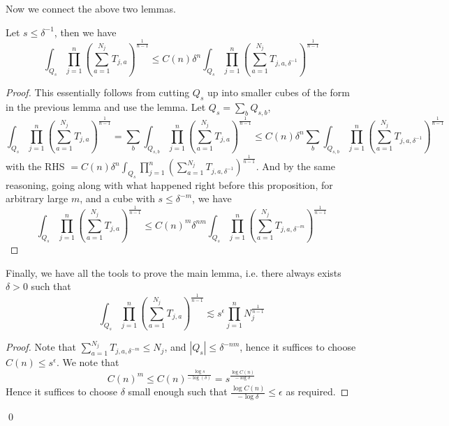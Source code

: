 Now we connect the above two lemmas.
\begin{proposition}
    Let $s\leq\delta^{-1}$, then we have
    \begin{equation*}
        \int_{Q_s}\prod_{j=1}^n\left(\sum_{a=1}^{N_j}T_{j,a}\right)^{\frac{1}{n-1}}\leq C(n)\delta^n\int_{Q_s}\prod_{j=1}^n\left(\sum_{a=1}^{N_j}T_{j,a,\delta^{-1}} \right)^{\frac{1}{n-1}}
    \end{equation*}
\end{proposition}
\begin{proof}
This essentially follows from cutting $Q_s$ up into smaller cubes of the form in the previous lemma and use the lemma. Let $Q_s=\sum_bQ_{s,b}$,
\begin{equation*}
    \int_{Q_s}\prod_{j=1}^n\left(\sum_{a=1}^{N_j}T_{j,a}\right)^{\frac{1}{n-1}}=\sum_b\int_{Q_{s, b}}\prod_{j=1}^n\left(\sum_{a=1}^{N_j}T_{j,a}\right)^{\frac{1}{n-1}}\leq C(n)\delta^n\sum_b\int_{Q_{s,b}}\prod_{j=1}^n\left(\sum_{a=1}^{N_j}T_{j,a, \delta^{-1}}\right)^\frac{1}{n-1}
\end{equation*}
with the RHS $=C(n)\delta^n\int_{Q_s}\prod_{j=1}^n\left(\sum_{a=1}^{N_j}T_{j,a, \delta^{-1}}\right)^\frac{1}{n-1}$. And by the same reasoning, going along with what happened right before this proposition, for arbitrary large $m$, and a cube with $s\leq\delta^{-m}$, we have
\begin{equation*}
    \int_{Q_s}\prod_{j=1}^n\left(\sum_{a=1}^{N_j}T_{j,a}\right)^{\frac{1}{n-1}}\leq C(n)^m\delta^{nm}\int_{Q_s}\prod_{j=1}^n\left(\sum_{a=1}^{N_j}T_{j,a,\delta^{-m}} \right)^{\frac{1}{n-1}}
\end{equation*}
\end{proof}

Finally, we have all the tools to prove the main lemma, i.e. there always exists $\delta>0$ such that
\begin{equation*}
    \int_{Q_s}\prod_{j=1}^n\left(\sum_{a=1}^{N_j}T_{j,a}\right)^{\frac{1}{n-1}}\lesssim s^\epsilon\prod_{j=1}^nN_j^{\frac{1}{n-1}}
\end{equation*}
\begin{proof}
    Note that $\sum_{a=1}^{N_j}T_{j,a,\delta^{-m}}\leq N_j$, and $|Q_s|\leq \delta^{-nm}$, hence it suffices to choose $C(n)\leq s^\epsilon$. We note that
    \begin{equation*}
        C(n)^m\leq C(n)^{\frac{\log s}{-\log(\delta)}}=s^{\frac{\log C(n)}{-\log\delta}}
    \end{equation*}
    Hence it suffices to choose $\delta$ small enough such that $\frac{\log C(n)}{-\log\delta}\leq\epsilon$ as required.
\end{proof}
\qed